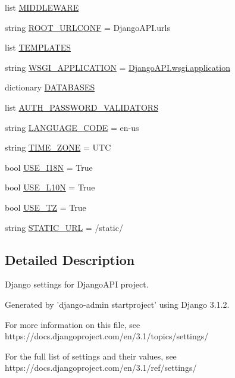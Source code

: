 \begin{DoxyCompactItemize}
\item 
list \hyperlink{namespace_django_a_p_i_1_1settings_ac887e1f9a29157170d65997869fd1622}{M\+I\+D\+D\+L\+E\+W\+A\+RE}
\item 
string \hyperlink{namespace_django_a_p_i_1_1settings_a0ba1c25901d8fcee1127fa0fadccf437}{R\+O\+O\+T\+\_\+\+U\+R\+L\+C\+O\+NF} = \textquotesingle{}Django\+A\+P\+I.\+urls\textquotesingle{}
\item 
list \hyperlink{namespace_django_a_p_i_1_1settings_ab20fa83b8af05b20341aa4c1a20e702a}{T\+E\+M\+P\+L\+A\+T\+ES}
\item 
string \hyperlink{namespace_django_a_p_i_1_1settings_ac273bb944ad5d46f05376f0d1b3f965f}{W\+S\+G\+I\+\_\+\+A\+P\+P\+L\+I\+C\+A\+T\+I\+ON} = \textquotesingle{}\hyperlink{namespace_django_a_p_i_1_1wsgi_a17ce6dcb6454377b68565dee1b63fd72}{Django\+A\+P\+I.\+wsgi.\+application}\textquotesingle{}
\item 
dictionary \hyperlink{namespace_django_a_p_i_1_1settings_a0531a3b62b4f42d1a8907af6333e268b}{D\+A\+T\+A\+B\+A\+S\+ES}
\item 
list \hyperlink{namespace_django_a_p_i_1_1settings_a4d3ddbe81a041850c7ae1ec6948a3072}{A\+U\+T\+H\+\_\+\+P\+A\+S\+S\+W\+O\+R\+D\+\_\+\+V\+A\+L\+I\+D\+A\+T\+O\+RS}
\item 
string \hyperlink{namespace_django_a_p_i_1_1settings_aa8e060b013d0a9853782508ba3f5ab82}{L\+A\+N\+G\+U\+A\+G\+E\+\_\+\+C\+O\+DE} = \textquotesingle{}en-\/us\textquotesingle{}
\item 
string \hyperlink{namespace_django_a_p_i_1_1settings_a14f07a099c10d075539d3eef77ea6681}{T\+I\+M\+E\+\_\+\+Z\+O\+NE} = \textquotesingle{}U\+TC\textquotesingle{}
\item 
bool \hyperlink{namespace_django_a_p_i_1_1settings_a844ec0e1769a5c432283ad4ae6837c87}{U\+S\+E\+\_\+\+I18N} = True
\item 
bool \hyperlink{namespace_django_a_p_i_1_1settings_aadfc85c481db7b3b5370df7cf2ca4424}{U\+S\+E\+\_\+\+L10N} = True
\item 
bool \hyperlink{namespace_django_a_p_i_1_1settings_ae4de0c127638dbd4ab0b5e697f9f4b57}{U\+S\+E\+\_\+\+TZ} = True
\item 
string \hyperlink{namespace_django_a_p_i_1_1settings_addf7559f2ec60338a86ac83aad937720}{S\+T\+A\+T\+I\+C\+\_\+\+U\+RL} = \textquotesingle{}/static/\textquotesingle{}
\end{DoxyCompactItemize}


\subsection{Detailed Description}
\begin{DoxyVerb}Django settings for DjangoAPI project.

Generated by 'django-admin startproject' using Django 3.1.2.

For more information on this file, see
https://docs.djangoproject.com/en/3.1/topics/settings/

For the full list of settings and their values, see
https://docs.djangoproject.com/en/3.1/ref/settings/
\end{DoxyVerb}
 

